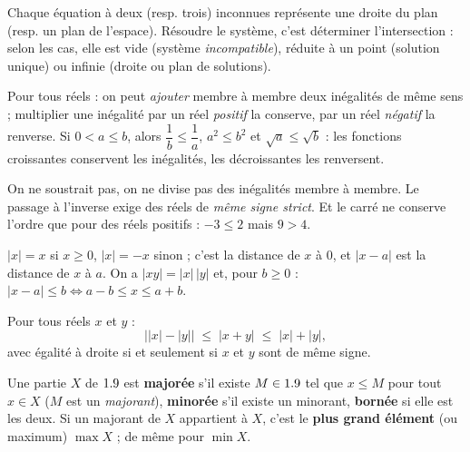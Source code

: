 \begin{propriete}
Chaque équation à deux (resp. trois) inconnues représente une droite du plan
(resp. un plan de l'espace). Résoudre le système, c'est déterminer
l'intersection : selon les cas, elle est vide (système \emph{incompatible}),
réduite à un point (solution unique) ou infinie (droite ou plan de solutions).
\end{propriete}


\begin{propriete}
Pour tous réels : on peut \emph{ajouter} membre à membre deux inégalités de
même sens ; multiplier une inégalité par un réel \emph{positif} la conserve,
par un réel \emph{négatif} la renverse. Si $0<a\leq b$, alors
$\dfrac{1}{b}\leq\dfrac{1}{a}$, $a^{2}\leq b^{2}$ et $\sqrt{a}\leq\sqrt{b}$ :
les fonctions croissantes conservent les inégalités, les décroissantes les
renversent.
\end{propriete}

\begin{attention}
On ne soustrait pas, on ne divise pas des inégalités membre à membre. Le
passage à l'inverse exige des réels de \emph{même signe strict}. Et le carré
ne conserve l'ordre que pour des réels positifs : $-3\leq2$ mais $9>4$.
\end{attention}

\begin{definition}
$|x|=x$ si $x\geq0$, $|x|=-x$ sinon ; c'est la distance de $x$ à $0$, et
$|x-a|$ est la distance de $x$ à $a$. On a $|xy|=|x|\,|y|$ et, pour $b\geq0$ :
$|x-a|\leq b\iff a-b\leq x\leq a+b$.
\end{definition}

\begin{theoreme}
Pour tous réels $x$ et $y$ :
\[
  \bigl||x|-|y|\bigr|\;\leq\;|x+y|\;\leq\;|x|+|y|,
\]
avec égalité à droite si et seulement si $x$ et $y$ sont de même signe.
\end{theoreme}

\begin{definition}
Une partie $X$ de $1.9$ est \textbf{majorée} s'il existe $M\in1.9$ tel que
$x\leq M$ pour tout $x\in X$ ($M$ est un \emph{majorant}), \textbf{minorée}
s'il existe un minorant, \textbf{bornée} si elle est les deux. Si un majorant
de $X$ appartient à $X$, c'est le \textbf{plus grand élément} (ou maximum)
$\max X$ ; de même pour $\min X$.
\end{definition}

